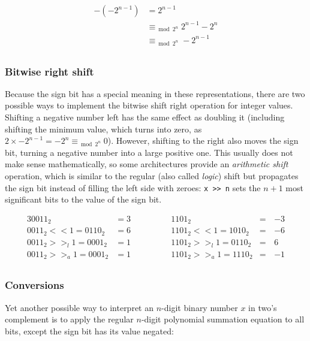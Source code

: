 \begin{align*}
    -(-2^{n - 1}) & = 2^{n - 1} \\
                  & \equiv_{\bmod{2^n}} 2^{n - 1} - 2^n \\
                  & \equiv_{\bmod{2^n}} -2^{n - 1} \\
\end{align*}

\subsubsection{Bitwise right shift}

Because the sign bit has a special meaning in these representations, there are
two possible ways to implement the bitwise shift right operation for integer
values.  Shifting a negative number left has the same effect as doubling it
(including shifting the minimum value, which turns into zero, as $2 \times
-2^{n-1} = -2^n \equiv_{\bmod{2^n}} 0$).  However, shifting to the right also
moves the sign bit, turning a negative number into a large positive one.  This
usually does not make sense mathematically, so some architectures provide an
\textit{arithmetic shift} operation, which is similar to the regular (also
called \textit{logic}) shift but propagates the sign bit instead of filling the
left side with zeroes: \texttt{x >{}> n} sets the $n + 1$ most significant bits
to the value of the sign bit.

\begin{alignat*}{3}
                    0011_2 &= 3 \qquad&\qquad                 1101_2 &= \,&-3 \\
    0011_2 <<   1 = 0110_2 &= 6 \qquad&\qquad 1101_2 <<   1 = 1010_2 &= \,&-6 \\
    0011_2 >>_l 1 = 0001_2 &= 1 \qquad&\qquad 1101_2 >>_l 1 = 0110_2 &= \,& 6 \\
    0011_2 >>_a 1 = 0001_2 &= 1 \qquad&\qquad 1101_2 >>_a 1 = 1110_2 &= \,&-1 \\
\end{alignat*}

\subsubsection{Conversions}

Yet another possible way to interpret an $n$-digit binary number $x$ in two's
complement is to apply the regular $n$-digit polynomial summation equation to
all bits, except the sign bit has its value negated:

